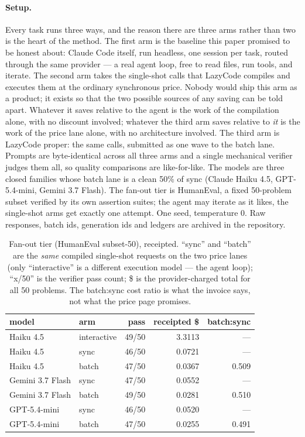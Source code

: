 \documentclass[11pt]{article}
\begin{document}
\paragraph{Setup.} Every task runs three ways, and the reason there are
three arms rather than two is the heart of the method. The first arm is
the baseline this paper promised to be honest about: Claude Code itself,
run headless, one session per task, routed through the same provider ---
a real agent loop, free to read files, run tools, and iterate. The
second arm takes the single-shot calls that LazyCode compiles and
executes them at the ordinary synchronous price. Nobody would ship this
arm as a product; it exists so that the two possible sources of any
saving can be told apart. Whatever it saves relative to the agent is the
work of the compilation alone, with no discount involved; whatever the
third arm saves relative to \emph{it} is the work of the price lane
alone, with no architecture involved. The third arm is LazyCode proper:
the same calls, submitted as one wave to the batch lane. Prompts are
byte-identical across all three arms and a single mechanical verifier
judges them all, so quality comparisons are like-for-like. The models
are three closed families whose batch lane is a clean 50\% of sync
(Claude Haiku 4.5, GPT-5.4-mini, Gemini 3.7 Flash). The fan-out tier is
HumanEval, a fixed 50-problem subset verified by its own assertion
suites; the agent may iterate as it likes, the single-shot arms get
exactly one attempt. One seed, temperature 0. Raw responses, batch ids,
generation ids and ledgers are archived in the repository.

\begin{table}[!htbp]
\centering
\caption{Fan-out tier (HumanEval subset-50), receipted. ``sync'' and
``batch'' are the \emph{same} compiled single-shot requests on the two
price lanes (only ``interactive'' is a different execution model --- the
agent loop); ``x/50'' is the verifier pass count; \$ is the
provider-charged total for all 50 problems. The batch:sync cost ratio is
what the invoice says, not what the price page promises.}
\label{tab:measured}
\small
\begin{tabular}{llrrr}
\toprule
model & arm & pass & receipted \$ & batch:sync \\
\midrule
Haiku 4.5 & interactive & 49/50 & 3.3113 & --- \\
Haiku 4.5 & sync        & 46/50 & 0.0721 & --- \\
Haiku 4.5 & batch       & 47/50 & 0.0367 & 0.509 \\
\addlinespace
Gemini 3.7 Flash & sync  & 47/50 & 0.0552 & --- \\
Gemini 3.7 Flash & batch & 49/50 & 0.0281 & 0.510 \\
\addlinespace
GPT-5.4-mini & sync  & 46/50 & 0.0520 & --- \\
GPT-5.4-mini & batch & 47/50 & 0.0255 & 0.491 \\
\bottomrule
\end{tabular}
\end{table}
\end{document}
